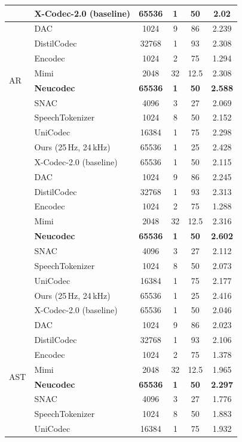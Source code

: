 \documentclass[preprint]{article}
\begin{document}
\begin{longtable}{llcccc}
  & X-Codec-2.0 (baseline) & 65536 & 1 & 50 & 2.02 \\
\midrule
\multirow{8}{*}{AR}
  & DAC & 1024 & 9 & 86 & 2.239 \\
  & DistilCodec & 32768 & 1 & 93 & 2.308 \\
  & Encodec & 1024 & 2 & 75 & 1.294 \\
  & Mimi & 2048 & 32 & 12.5 & 2.308 \\
  & \textbf{Neucodec} & \textbf{65536} & \textbf{1} & \textbf{50} & \textbf{2.588} \\
  & SNAC & 4096 & 3 & 27 & 2.069 \\
  & SpeechTokenizer & 1024 & 8 & 50 & 2.152 \\
  & UniCodec & 16384 & 1 & 75 & 2.298 \\
  & Ours (25\,Hz, 24\,kHz) & 65536 & 1 & 25 & 2.428 \\
  & X-Codec-2.0 (baseline) & 65536 & 1 & 50 & 2.115 \\
\newpage
\multirow{8}{*}{AS}
  & DAC & 1024 & 9 & 86 & 2.245 \\
  & DistilCodec & 32768 & 1 & 93 & 2.313 \\
  & Encodec & 1024 & 2 & 75 & 1.288 \\
  & Mimi & 2048 & 32 & 12.5 & 2.316 \\
  & \textbf{Neucodec} & \textbf{65536} & \textbf{1} & \textbf{50} & \textbf{2.602} \\
  & SNAC & 4096 & 3 & 27 & 2.112 \\
  & SpeechTokenizer & 1024 & 8 & 50 & 2.073 \\
  & UniCodec & 16384 & 1 & 75 & 2.177 \\
  & Ours (25\,Hz, 24\,kHz) & 65536 & 1 & 25 & 2.416 \\
  & X-Codec-2.0 (baseline) & 65536 & 1 & 50 & 2.046 \\
\midrule
\multirow{8}{*}{AST}
  & DAC & 1024 & 9 & 86 & 2.023 \\
  & DistilCodec & 32768 & 1 & 93 & 2.106 \\
  & Encodec & 1024 & 2 & 75 & 1.378 \\
  & Mimi & 2048 & 32 & 12.5 & 1.965 \\
  & \textbf{Neucodec} & \textbf{65536} & \textbf{1} & \textbf{50} & \textbf{2.297} \\
  & SNAC & 4096 & 3 & 27 & 1.776 \\
  & SpeechTokenizer & 1024 & 8 & 50 & 1.883 \\
  & UniCodec & 16384 & 1 & 75 & 1.932 \\

\end{longtable}
\end{document}
